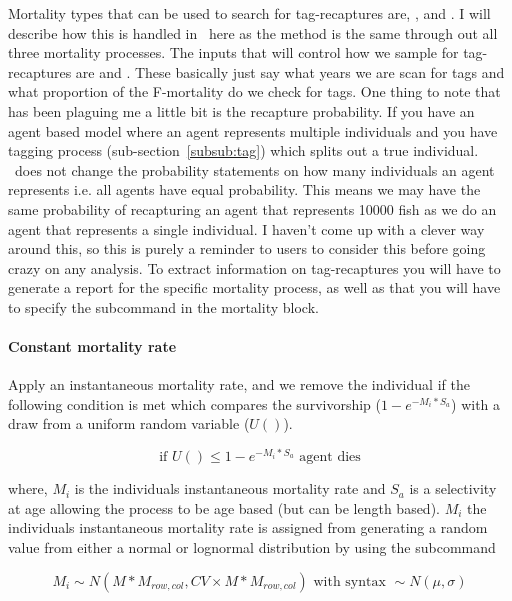 Mortality types that can be used to search for tag-recaptures are, ,  and . I will describe how this is handled in \IBM\ here as the method is the same through out all three mortality processes. The inputs that will control how we sample for tag-recaptures are  and . These basically just say what years we are scan for tags and what proportion of the F-mortality do we check for tags. One thing to note that has been plaguing me a little bit is the recapture probability. If you have an agent based model where an agent represents multiple individuals and you have tagging process (sub-section~\ref{subsub:tag}) which splits out a true individual. \IBM\ does not change the probability statements on how many individuals an agent represents i.e. all agents have equal probability. This means we may have the same probability of recapturing an agent that represents 10000 fish as we do an agent that represents a single individual. I haven't come up with a clever way around this, so this is purely a reminder to users to consider this before going crazy on any analysis. To extract information on tag-recaptures you will have to generate a report for the specific mortality process, as well as that you will have to specify the subcommand  in the  mortality block.

\paragraph{Constant mortality rate}
Apply an instantaneous mortality rate, and we remove the individual if the following condition is met which compares the survivorship ($1 - e^{-M_i * S_a}$) with a draw from a uniform random variable ($U()$).

\begin{equation}\label{constan_mort}
\text{if } U() \leq 1 - e^{-M_i * S_a} \text{ agent dies}
\end{equation}

where, $M_i$ is the individuals instantaneous mortality rate and $S_a$ is a selectivity at age allowing the process to be age based (but can be length based). $M_i$ the individuals instantaneous mortality rate is assigned from generating a random value from either a normal or lognormal distribution by using the subcommand 

\begin{equation}\label{constan_mort_assign}
M_i \sim N(M * M_{row,col}, CV\times M * M_{row,col}) \text{ with syntax } \sim N(\mu,\sigma)
\end{equation}

